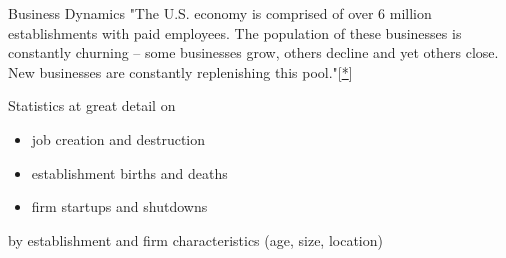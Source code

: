 













\begin{frame}
\begin{block}{Business Dynamics}
"The U.S. economy is comprised of over 6 million establishments with paid employees. The population of these businesses is constantly churning -- some businesses grow, others decline and yet others close. New businesses are constantly replenishing this pool."[\href{https://www.census.gov/ces/dataproducts/bds/overview.html}{*}]
\end{block}
\begin{block}{Statistics at great detail on }
\begin{itemize}
\item job creation and destruction
\item establishment births and deaths
\item firm startups and shutdowns
\end{itemize}
by establishment and firm characteristics (age, size, location)
\end{block}
\end{frame}


